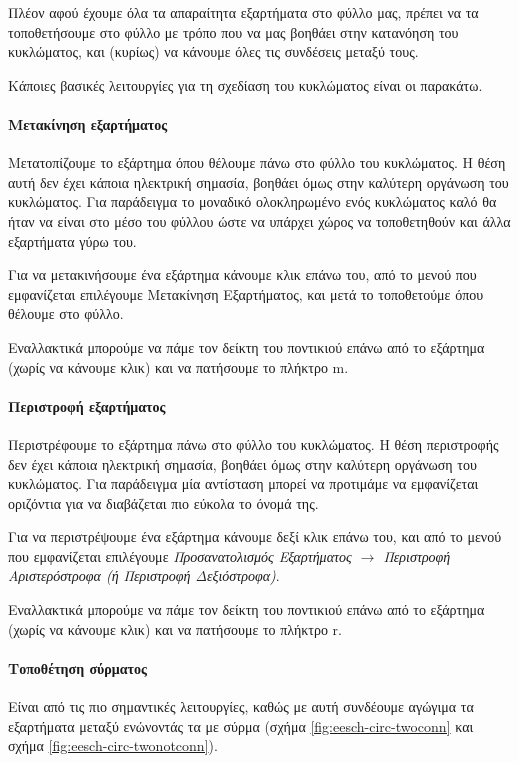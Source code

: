 \documentclass[a4paper]{article}
\begin{document}
Πλέον αφού έχουμε όλα τα απαραίτητα εξαρτήματα στο φύλλο μας, πρέπει να τα τοποθετήσουμε στο φύλλο με τρόπο που να μας βοηθάει στην κατανόηση του κυκλώματος, και (κυρίως) να κάνουμε όλες τις συνδέσεις μεταξύ τους.

Κάποιες βασικές λειτουργίες για τη σχεδίαση του κυκλώματος είναι οι παρακάτω.

\paragraph{Μετακίνηση εξαρτήματος}
Μετατοπίζουμε το εξάρτημα όπου θέλουμε πάνω στο φύλλο του κυκλώματος. Η θέση αυτή δεν έχει κάποια ηλεκτρική σημασία, βοηθάει όμως στην καλύτερη οργάνωση του κυκλώματος. Για παράδειγμα το μοναδικό ολοκληρωμένο ενός κυκλώματος καλό θα ήταν να είναι στο μέσο του φύλλου ώστε να υπάρχει χώρος να τοποθετηθούν και άλλα εξαρτήματα γύρω του.

Για να μετακινήσουμε ένα εξάρτημα κάνουμε κλικ επάνω του, από το μενού που εμφανίζεται επιλέγουμε Μετακίνηση Εξαρτήματος, και μετά το τοποθετούμε όπου θέλουμε στο φύλλο. 

Εναλλακτικά μπορούμε να πάμε τον δείκτη του ποντικιού επάνω από το εξάρτημα (χωρίς να κάνουμε κλικ) και να πατήσουμε το πλήκτρο m.

\paragraph{Περιστροφή εξαρτήματος}
Περιστρέφουμε το εξάρτημα πάνω στο φύλλο του κυκλώματος. Η θέση περιστροφής δεν έχει κάποια ηλεκτρική σημασία, βοηθάει όμως στην καλύτερη οργάνωση του κυκλώματος. Για παράδειγμα μία αντίσταση μπορεί να προτιμάμε να εμφανίζεται οριζόντια για να διαβάζεται πιο εύκολα το όνομά της.

Για να περιστρέψουμε ένα εξάρτημα κάνουμε δεξί κλικ επάνω του, και από το μενού που εμφανίζεται επιλέγουμε \textit{Προσανατολισμός Εξαρτήματος $\rightarrow$ Περιστροφή Αριστερόστροφα (ή Περιστροφή Δεξιόστροφα)}. 

Εναλλακτικά μπορούμε να πάμε τον δείκτη του ποντικιού επάνω από το εξάρτημα (χωρίς να κάνουμε κλικ) και να πατήσουμε το πλήκτρο r.

\paragraph{Τοποθέτηση σύρματος}
Είναι από τις πιο σημαντικές λειτουργίες, καθώς με αυτή συνδέουμε αγώγιμα τα εξαρτήματα μεταξύ ενώνοντάς τα με σύρμα (σχήμα \ref{fig:eesch-circ-twoconn} και σχήμα \ref{fig:eesch-circ-twonotconn}).
\end{document}
